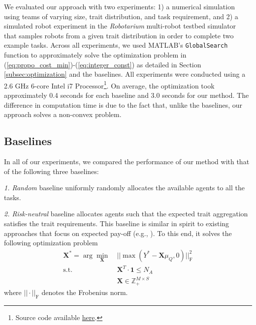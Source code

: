 \documentclass[letterpaper, 10 pt, conference]{ieeeconf}  %
\newcommand{\blue}[1]{\color{blue} #1 \color{black}}
\begin{document}
We evaluated our approach with two experiments: 1) a numerical simulation using teams of varying size, trait distribution, and task requirement, and 2) a simulated robot experiment in the \emph{Robotarium} multi-robot testbed simulator~\cite{wilson2020} that samples robots from a given trait distribution in order to complete two example tasks. Across all experiments, we used MATLAB's \verb|GlobalSearch| function to approximately solve the optimization problem in (\ref{eq:propo_cost_min})-(\ref{eq:integer_const}) as detailed in Section \ref{subsec:optimization} and the baselines. All experiments were conducted using a 2.6 GHz 6-core Intel i7 Processor\footnote{Source code available \href{https://github.com/maxrudolph1/risk_adaptive_task_allocation}{here}.}. On average, the optimization took approximately 0.4 seconds for each baseline and 3.0 seconds for our method. The difference in computation time is due to the fact that, unlike the baselines, our approach solves a non-convex problem.


\subsection{Baselines}
\label{sec:opt_crit}

In all of our experiments, we compared the performance of our method with that of the following three baselines:
\vspace{3pt}

\noindent \textit{1. Random} baseline uniformly randomly allocates the available agents to all the tasks.

\vspace{3pt}
\noindent \textit{2. Risk-neutral} baseline allocates agents such that the expected trait aggregation satisfies the trait requirements. This baseline is similar in spirit to existing approaches that focus on expected pay-off (e.g., \cite{prorok_redundant_2019,choudhury2020dynamic}). To this end, it solves the following optimization problem
\begin{align}
    \bm{X}^* = \arg \min_{\bm{X}} &\ ||\max (Y^* - \bm{X}\mu_Q , 0)||^2_\text{F} \nonumber \\
    \mathrm{s.t.} &\ \bm{X}^T \cdot \bm{1} \leq N_A \nonumber \\
    &\ \bm{X} \in \mathbb{Z}_+^{M \times S} \nonumber
\end{align}
where $|| \cdot ||_\text{F}$ denotes the Frobenius norm.
\end{document}

